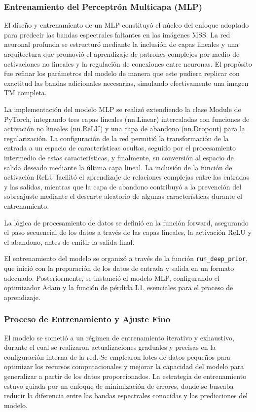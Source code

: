             \subsubsection{Entrenamiento del Perceptrón Multicapa (MLP)}
                El diseño y entrenamiento de un MLP constituyó el núcleo del enfoque adoptado para predecir las bandas espectrales faltantes en las imágenes MSS. La red neuronal profunda se estructuró mediante la inclusión de capas lineales y una arquitectura que promovió el aprendizaje de patrones complejos por medio de activaciones no lineales y la regulación de conexiones entre neuronas. El propósito fue refinar los parámetros del modelo de manera que este pudiera replicar con exactitud las bandas adicionales necesarias, simulando efectivamente una imagen TM completa.

                La implementación del modelo MLP se realizó extendiendo la clase Module de PyTorch, integrando tres capas lineales (nn.Linear) intercaladas con funciones de activación no lineales (nn.ReLU) y una capa de abandono (nn.Dropout) para la regularización. La configuración de la red permitió la transformación de la entrada a un espacio de características ocultas, seguido por el procesamiento intermedio de estas características, y finalmente, su conversión al espacio de salida deseado mediante la última capa lineal. La inclusión de la función de activación ReLU facilitó el aprendizaje de relaciones complejas entre las entradas y las salidas, mientras que la capa de abandono contribuyó a la prevención del sobreajuste mediante el descarte aleatorio de algunas características durante el entrenamiento.
                
                La lógica de procesamiento de datos se definió en la función forward, asegurando el paso secuencial de los datos a través de las capas lineales, la activación ReLU y el abandono, antes de emitir la salida final.
                
                El entrenamiento del modelo se organizó a través de la función \texttt{run\_deep\_prior}, que inició con la preparación de los datos de entrada y salida en un formato adecuado. Posteriormente, se instanció el modelo MLP, configurando el optimizador Adam y la función de pérdida L1, esenciales para el proceso de aprendizaje.

            \subsubsection{Proceso de Entrenamiento y Ajuste Fino}
                El modelo se sometió a un régimen de entrenamiento iterativo y exhaustivo, durante el cual se realizaron actualizaciones graduales y precisas en la configuración interna de la red. Se emplearon lotes de datos pequeños para optimizar los recursos computacionales y mejorar la capacidad del modelo para generalizar a partir de los datos proporcionados. La estrategia de entrenamiento estuvo guiada por un enfoque de minimización de errores, donde se buscaba reducir la diferencia entre las bandas espectrales conocidas y las predicciones del modelo.



